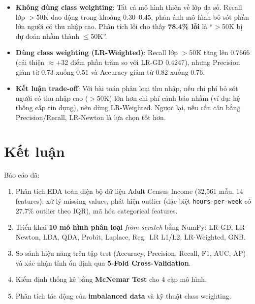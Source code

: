\documentclass[12pt, a4paper]{article}
\begin{document}
\begin{itemize}
  \item \textbf{Không dùng class weighting}: Tất cả mô hình thiên về lớp đa số.
        Recall lớp $>$50K dao động trong khoảng $0.30$--$0.45$, phản ánh mô hình bỏ sót
        phần lớn người có thu nhập cao.
        Phân tích lỗi cho thấy \textbf{78.4\% lỗi} là ``$>$50K bị dự đoán nhầm thành $\leq$50K''.
  \item \textbf{Dùng class weighting (LR-Weighted)}: Recall lớp $>$50K tăng lên $0.7666$
        (cải thiện $\approx$+32 điểm phần trăm so với LR-GD $0.4247$), nhưng Precision
        giảm từ $0.73$ xuống $0.51$ và Accuracy giảm từ $0.82$ xuống $0.76$.
  \item \textbf{Kết luận trade-off}: Với bài toán phân loại thu nhập, nếu chi phí bỏ sót
        người có thu nhập cao ($>$50K) lớn hơn chi phí cảnh báo nhầm (ví dụ: hệ thống
        cấp tín dụng), nên dùng LR-Weighted. Ngược lại, nếu cần cân bằng Precision/Recall,
        LR-Newton là lựa chọn tốt hơn.
\end{itemize}

\section{Kết luận}
\label{sec:conclusion}

Báo cáo đã:
\begin{enumerate}
  \item Phân tích EDA toàn diện bộ dữ liệu Adult Census Income (32{,}561 mẫu, 14 features):
        xử lý missing values, phát hiện outlier (đặc biệt \texttt{hours-per-week} có
        27.7\% outlier theo IQR), mã hóa categorical features.
  \item Triển khai \textbf{10 mô hình phân loại} \emph{from scratch} bằng NumPy:
        LR-GD, LR-Newton, LDA, QDA, Probit, Laplace, Reg.\ LR L1/L2, LR-Weighted, GNB.
  \item So sánh hiệu năng trên tập test (Accuracy, Precision, Recall, F1, AUC, AP)
        và xác nhận tính ổn định qua \textbf{5-Fold Cross-Validation}.
  \item Kiểm định thống kê bằng \textbf{McNemar Test} cho 4 cặp mô hình.
  \item Phân tích tác động của \textbf{imbalanced data} và kỹ thuật class weighting.
\end{enumerate}
\end{document}
